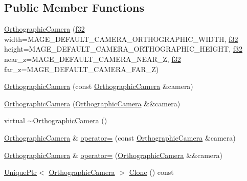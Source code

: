 \subsection*{Public Member Functions}
\begin{DoxyCompactItemize}
\item 
\hyperlink{classmage_1_1_orthographic_camera_a36c301d886a0e823f6f6a846c0c419d8}{Orthographic\+Camera} (\hyperlink{namespacemage_a6a44ad388483959dc4dff9f2aef91431}{f32} width=M\+A\+G\+E\+\_\+\+D\+E\+F\+A\+U\+L\+T\+\_\+\+C\+A\+M\+E\+R\+A\+\_\+\+O\+R\+T\+H\+O\+G\+R\+A\+P\+H\+I\+C\+\_\+\+W\+I\+D\+TH, \hyperlink{namespacemage_a6a44ad388483959dc4dff9f2aef91431}{f32} height=M\+A\+G\+E\+\_\+\+D\+E\+F\+A\+U\+L\+T\+\_\+\+C\+A\+M\+E\+R\+A\+\_\+\+O\+R\+T\+H\+O\+G\+R\+A\+P\+H\+I\+C\+\_\+\+H\+E\+I\+G\+HT, \hyperlink{namespacemage_a6a44ad388483959dc4dff9f2aef91431}{f32} near\+\_\+z=M\+A\+G\+E\+\_\+\+D\+E\+F\+A\+U\+L\+T\+\_\+\+C\+A\+M\+E\+R\+A\+\_\+\+N\+E\+A\+R\+\_\+Z, \hyperlink{namespacemage_a6a44ad388483959dc4dff9f2aef91431}{f32} far\+\_\+z=M\+A\+G\+E\+\_\+\+D\+E\+F\+A\+U\+L\+T\+\_\+\+C\+A\+M\+E\+R\+A\+\_\+\+F\+A\+R\+\_\+Z)
\item 
\hyperlink{classmage_1_1_orthographic_camera_aad12a2901577a187bb53e4c2e2f5a658}{Orthographic\+Camera} (const \hyperlink{classmage_1_1_orthographic_camera}{Orthographic\+Camera} \&camera)
\item 
\hyperlink{classmage_1_1_orthographic_camera_ac7b6bd4cb086403e130e5deaaa16046d}{Orthographic\+Camera} (\hyperlink{classmage_1_1_orthographic_camera}{Orthographic\+Camera} \&\&camera)
\item 
virtual \hyperlink{classmage_1_1_orthographic_camera_ac7d1f4ce12a5d0a2539b610f14f59304}{$\sim$\+Orthographic\+Camera} ()
\item 
\hyperlink{classmage_1_1_orthographic_camera}{Orthographic\+Camera} \& \hyperlink{classmage_1_1_orthographic_camera_ac4a319517ed3b9708028e555660b23aa}{operator=} (const \hyperlink{classmage_1_1_orthographic_camera}{Orthographic\+Camera} \&camera)
\item 
\hyperlink{classmage_1_1_orthographic_camera}{Orthographic\+Camera} \& \hyperlink{classmage_1_1_orthographic_camera_a7fc303921e07ae18dd6fb7e9b7812847}{operator=} (\hyperlink{classmage_1_1_orthographic_camera}{Orthographic\+Camera} \&\&camera)
\item 
\hyperlink{namespacemage_a3316d7143a973e37adf1110f2e80ca31}{Unique\+Ptr}$<$ \hyperlink{classmage_1_1_orthographic_camera}{Orthographic\+Camera} $>$ \hyperlink{classmage_1_1_orthographic_camera_a873f0a715743a7dc104935995696dd33}{Clone} () const

\end{DoxyCompactItemize}
